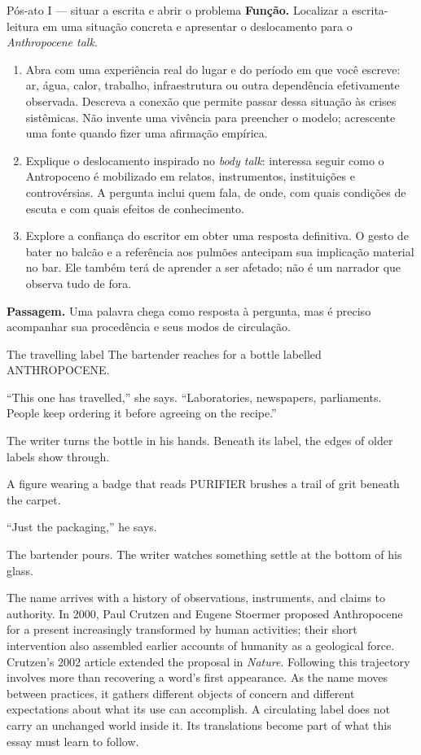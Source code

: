 \begin{orientacao}{Pós-ato I --- situar a escrita e abrir o problema}
\textbf{Função.} Localizar a escrita-leitura em uma situação concreta e
apresentar o deslocamento para o \textit{Anthropocene talk}.
\begin{enumerate}
\item Abra com uma experiência real do lugar e do período em que você
escreve: ar, água, calor, trabalho, infraestrutura ou outra dependência
efetivamente observada. Descreva a conexão que permite passar dessa
situação às crises sistêmicas. Não invente uma vivência para preencher
o modelo; acrescente uma fonte quando fizer uma afirmação empírica.
\item Explique o deslocamento inspirado no \textit{body talk}: interessa
seguir como o Antropoceno é mobilizado em relatos, instrumentos,
instituições e controvérsias. A pergunta inclui quem fala, de onde, com
quais condições de escuta e com quais efeitos de conhecimento.
\item Explore a confiança do escritor em obter uma resposta definitiva.
O gesto de bater no balcão e a referência aos pulmões antecipam sua
implicação material no bar. Ele também terá de aprender a ser afetado;
não é um narrador que observa tudo de fora.
\end{enumerate}
\textbf{Passagem.} Uma palavra chega como resposta à pergunta, mas é
preciso acompanhar sua procedência e seus modos de circulação.
\end{orientacao}

\begin{ato}{The travelling label}
The bartender reaches for a bottle labelled ANTHROPOCENE.

“This one has travelled,” she says. “Laboratories, newspapers, parliaments.
People keep ordering it before agreeing on the recipe.”

The writer turns the bottle in his hands. Beneath its label, the edges of
older labels show through.

A figure wearing a badge that reads PURIFIER brushes a trail of grit
beneath the carpet.

“Just the packaging,” he says.

The bartender pours. The writer watches something settle at the bottom
of his glass.
\end{ato}

The name arrives with a history of observations, instruments, and claims
to authority. In 2000, Paul Crutzen and Eugene Stoermer proposed
Anthropocene for a present increasingly transformed by human activities;
their short intervention also assembled earlier accounts of humanity as
a geological force.
Crutzen's 2002 article extended the proposal in \textit{Nature}.
Following this trajectory involves more than recovering a word's first
appearance. As the name moves between practices, it gathers different
objects of concern and different expectations about what its use can
accomplish. A circulating label does not carry an unchanged world inside
it. Its translations become part of what this essay must learn to follow.

